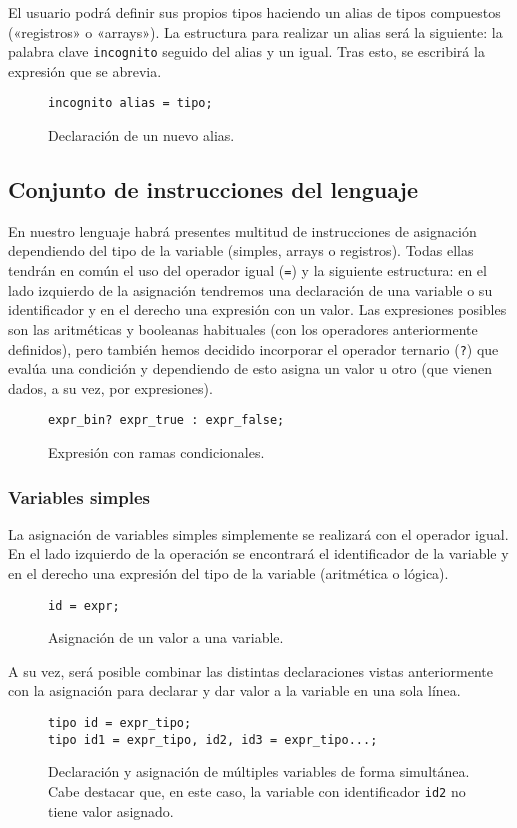 El usuario podrá definir sus propios tipos haciendo un alias de tipos
compuestos («registros» o «arrays»). La estructura para realizar un alias será la
siguiente: la palabra clave \lstinline{incognito} seguido del alias y un igual. Tras esto,
se escribirá la expresión que se abrevia.
\begin{figure}[htbp]
    \centering
    \begin{lstlisting}
incognito alias = tipo;
    \end{lstlisting}
    \caption{Declaración de un nuevo alias.}
\end{figure}

\subsection{Conjunto de instrucciones del lenguaje}
En nuestro lenguaje habrá presentes multitud de instrucciones de asignación
dependiendo del tipo de la variable (simples, arrays o registros). Todas ellas
tendrán en común el uso del operador igual (\lstinline{=}) y la siguiente estructura: en el
lado izquierdo de la asignación tendremos una declaración de una variable o su
identificador y en el derecho una expresión con un valor. Las expresiones
posibles son las aritméticas y booleanas habituales (con los operadores
anteriormente definidos), pero también hemos decidido incorporar el operador
ternario (\lstinline{?}) que evalúa una condición y dependiendo de esto asigna un valor u
otro (que vienen dados, a su vez, por expresiones). 
\begin{figure}[htbp]
    \centering
    \begin{lstlisting}
expr_bin? expr_true : expr_false;
    \end{lstlisting}
    \caption{Expresión con ramas condicionales.}
\end{figure}

\subsubsection{Variables simples}
La asignación de variables simples simplemente se realizará con el operador
igual. En el lado izquierdo de la operación se encontrará el identificador de la
variable y en el derecho una expresión del tipo de la variable (aritmética o
lógica).
\begin{figure}[htbp]
    \centering
    \begin{lstlisting}
id = expr;
    \end{lstlisting}
    \caption{Asignación de un valor a una variable.}
\end{figure}
A su vez, será posible combinar las distintas declaraciones vistas anteriormente
con la asignación para declarar y dar valor a la variable en una sola línea.
\begin{figure}[htbp]
    \centering
    \begin{lstlisting}
tipo id = expr_tipo;
tipo id1 = expr_tipo, id2, id3 = expr_tipo...;
    \end{lstlisting}
    \caption{Declaración y asignación de múltiples variables de forma
    simultánea. Cabe destacar que, en este caso, la variable con identificador \lstinline{id2}
    no tiene valor asignado.}
\end{figure}

